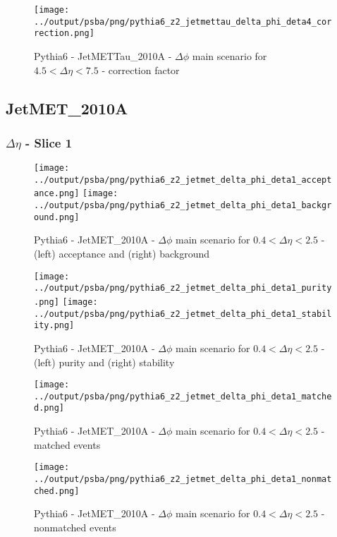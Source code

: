 \documentclass[11pt]{book}
\begin{document}
\begin{figure}[ht]
\centering
\texttt{[image: ../output/psba/png/pythia6\_z2\_jetmettau\_delta\_phi\_deta4\_correction.png]}
\caption{Pythia6 - JetMETTau\_2010A - $\Delta\phi$ main scenario for $4.5 < \Delta\eta < 7.5$ - correction factor}
\label{fig:p6_jetmettau_delta_phi_deta4_correction}
\end{figure}

\clearpage
\subsection{JetMET\_2010A}

\subsubsection{$\Delta\eta$ - Slice 1}
\begin{figure}[ht]
\centering
\texttt{[image: ../output/psba/png/pythia6\_z2\_jetmet\_delta\_phi\_deta1\_acceptance.png]}
\texttt{[image: ../output/psba/png/pythia6\_z2\_jetmet\_delta\_phi\_deta1\_background.png]}
\caption{Pythia6 - JetMET\_2010A - $\Delta\phi$ main scenario for $0.4 < \Delta\eta < 2.5$ - (left) acceptance and (right) background}
\label{fig:p6_jetmet_delta_phi_deta1_ab}
\end{figure}

\begin{figure}[ht]
\centering
\texttt{[image: ../output/psba/png/pythia6\_z2\_jetmet\_delta\_phi\_deta1\_purity.png]}
\texttt{[image: ../output/psba/png/pythia6\_z2\_jetmet\_delta\_phi\_deta1\_stability.png]}
\caption{Pythia6 - JetMET\_2010A - $\Delta\phi$ main scenario for $0.4 < \Delta\eta < 2.5$ - (left) purity and (right) stability}
\label{fig:p6_jetmet_delta_phi_deta1_ps}
\end{figure}

\begin{figure}[ht]
\centering
\texttt{[image: ../output/psba/png/pythia6\_z2\_jetmet\_delta\_phi\_deta1\_matched.png]}
\caption{Pythia6 - JetMET\_2010A - $\Delta\phi$ main scenario for $0.4 < \Delta\eta < 2.5$ - matched events}
\label{fig:p6_jetmet_delta_phi_deta1_matched}
\end{figure}

\begin{figure}[ht]
\centering
\texttt{[image: ../output/psba/png/pythia6\_z2\_jetmet\_delta\_phi\_deta1\_nonmatched.png]}
\caption{Pythia6 - JetMET\_2010A - $\Delta\phi$ main scenario for $0.4 < \Delta\eta < 2.5$ - nonmatched events}
\label{fig:p6_jetmet_delta_phi_deta1_nonmatched}
\end{figure}
\end{document}
